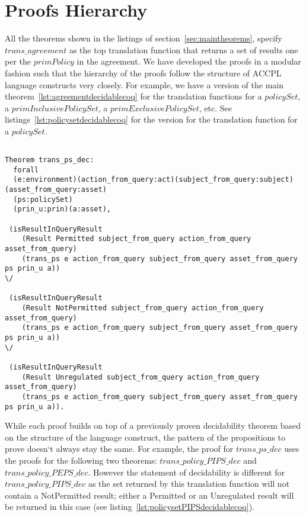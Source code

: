\section{Proofs Hierarchy}

All the theorems shown in the listings of section~\ref{sec:maintheorems}, specify $trans\_agreement$ as the top translation function that returns a set of results one per the $primPolicy$ in the agreement. We have developed the proofs in a modular fashion such that the hierarchy of the proofs follow the structure of \ac{ACCPL} language constructs very closely. For example, we have a version of the main theorem~\ref{lst:agreementdecidablecoq} for the translation functions for a $policySet$, a $primInclusivePolicySet$, a $primExclusivePolicySet$, etc. See listings~\ref{lst:policysetdecidablecoq} for the version for the translation function for a $policySet$.

\begin{lstlisting}

Theorem trans_ps_dec:
  forall
  (e:environment)(action_from_query:act)(subject_from_query:subject)(asset_from_query:asset)
  (ps:policySet)
  (prin_u:prin)(a:asset),

 (isResultInQueryResult 
    (Result Permitted subject_from_query action_from_query asset_from_query)
    (trans_ps e action_from_query subject_from_query asset_from_query ps prin_u a)) 
\/

 (isResultInQueryResult 
    (Result NotPermitted subject_from_query action_from_query asset_from_query)
    (trans_ps e action_from_query subject_from_query asset_from_query ps prin_u a)) 
\/

 (isResultInQueryResult 
    (Result Unregulated subject_from_query action_from_query asset_from_query)
    (trans_ps e action_from_query subject_from_query asset_from_query ps prin_u a)).

\end{lstlisting}


While each proof builds on top of a previously proven decidability theorem based on the structure of the language construct, the pattern of the propositions to prove doesn`t always stay the same. For example, the proof for $trans\_ps\_dec$ uses the proofs for the following two theorems: $trans\_policy\_PIPS\_dec$ and $trans\_policy\_PEPS\_dec$. However the statement of decidability is different for $trans\_policy\_PIPS\_dec$ as the set returned by this translation function will not contain a NotPermitted result; either a Permitted or an Unregulated result will be returned in this case (see listing~\ref{lst:policysetPIPSdecidablecoq}).

